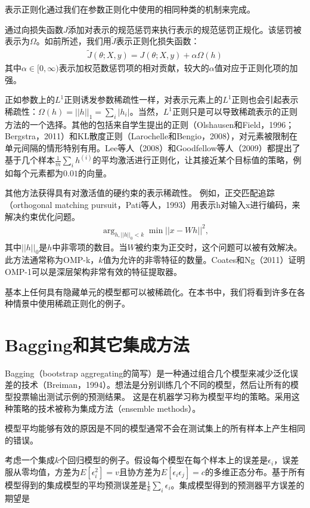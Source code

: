 表示正则化通过我们在参数正则化中使用的相同种类的机制来完成。

通过向损失函数$J$添加对表示的规范惩罚来执行表示的规范惩罚正规化。该惩罚被表示为$\Omega$。如前所述，我们用$\widetilde{J}$表示正则化损失函数：
$$
\begin{aligned}
	\widetilde{J} (\theta; X, y) = J(\theta; X, y) + \alpha \Omega (h)
\end{aligned}
$$
其中$\alpha \in [0, \infty)$表示加权范数惩罚项的相对贡献，较大的$\alpha$值对应于正则化项的加强。

正如参数上的$L^1$正则诱发参数稀疏性一样，对表示元素上的$L^1$正则也会引起表示稀疏性：$\Omega (h) = ||h||_1 = \sum_i |h_i|$。当然，$L^1$正则只是可以导致稀疏表示的正则方法的一个选择。其他的包括来自学生提出的正则（Olshausen和Field，1996；Bergstra，2011）和KL散度正则（Larochelle和Bengio，2008），对元素被限制在单元间隔的情形特别有用。Lee等人（2008）和Goodfellow等人（2009）都提出了基于几个样本$\frac{1}{m} \sum_i h^{(i)}$的平均激活进行正则化，让其接近某个目标值的策略，例如每个元素都为$0.01$的向量。

其他方法获得具有对激活值的硬约束的表示稀疏性。 例如，正交匹配追踪（orthogonal matching pursuit，Pati等人，1993）用表示h对输入x进行编码，来解决约束优化问题。
$$
\begin{aligned}
	\arg_{h, ||h||_0 < k} \min ||x - Wh||^2,
\end{aligned}
$$
其中$||h||_0$是$h$中非零项的数目。当$W$被约束为正交时，这个问题可以被有效解决。此方法通常称为OMP-k，$k$值为允许的非零特征的数量。Coates和Ng（2011）证明OMP-1可以是深层架构非常有效的特征提取器。

基本上任何具有隐藏单元的模型都可以被稀疏化。在本书中，我们将看到许多在各种情景中使用稀疏正则化的例子。

\section{Bagging和其它集成方法}

Bagging（bootstrap aggregating的简写）是一种通过组合几个模型来减少泛化误差的技术（Breiman，1994）。想法是分别训练几个不同的模型，然后让所有的模型投票输出测试示例的预测结果。 这是在机器学习称为模型平均的策略。采用这种策略的技术被称为集成方法（ensemble methods）。

模型平均能够有效的原因是不同的模型通常不会在测试集上的所有样本上产生相同的错误。

考虑一个集成$k$个回归模型的例子。假设每个模型在每个样本上的误差是$\epsilon_i$，误差服从零均值，方差为$E[\epsilon_i^2] = v$且协方差为$E[\epsilon_i \epsilon_j] = c$的多维正态分布。基于所有模型得到的集成模型的平均预测误差是$\frac{1}{k} \sum_i \epsilon_i$。集成模型得到的预测器平方误差的期望是

